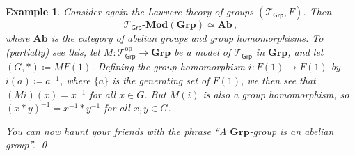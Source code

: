 \documentclass[a4paper,11pt]{article}
\theoremstyle{break_italics}
\theoremstyle{break_upright}
\newtheorem*{example*}{Example}
\theoremstyle{remark}
\newcommand{\op}{\mathrm{op}}
\begin{document}
\begin{example*}
	Consider again the Lawvere theory of groups $(\mathcal T_{\mathsf{Grp}}, F)$. Then
	\[
		\mathcal{T_{\mathsf{Grp}}}\text{-}\mathbf{Mod}(\mathbf{Grp}) \simeq \mathbf{Ab}\,,
	\]
	where $\mathbf{Ab}$ is the category of abelian groups and group homomorphisms. To (partially) see this, let $M \colon \mathcal T_{\mathsf{Grp}}^\op \to \mathbf{Grp}$ be a model of $\mathcal T_{\mathsf{Grp}}$ in $\mathbf{Grp}$, and let $(G,*) \coloneqq MF(1)$. Defining the group homomorphism $i \colon F(1) \to F(1)$ by $i(a) \coloneqq a^{-1}$, where $\{a\}$ is the generating set of $F(1)$, we then see that $(Mi)(x) = x^{-1}$ for all $x \in G$. But $M(i)$ is also a group homomorphism, so $(x*y)^{-1} = x^{-1} * y^{-1}$ for all $x,y \in G$.
	
	
	You can now haunt your friends with the phrase ``A $\mathbf{Grp}$-group is an abelian group''. \qed
\end{example*}






\clearpage \newpage
\renewcommand \refname{Bibliography}


\nocite{*}
\end{document}
